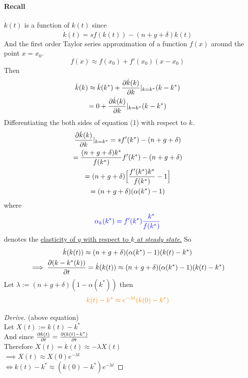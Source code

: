 \documentclass[]{article}
\begin{document}
	    \paragraph{Recall} $\dot{k}(t)$ is a function of $k(t)$ since 
	    \begin{equation}
	        \dot{k}(t) = sf(k(t)) - (n+g+\delta)k(t)
	    \end{equation}
	    And the first order Taylor series approximation of a function $f(x)$ around the point $x = x_0$.
	    \[
	        f(x) \approx f(x_0) + f'(x_0)(x - x_0)
	    \]
	    Then
	    \begin{gather*}
	        \dot{k}(k) \approx \dot{k}(k^*) + \frac{\partial{\dot{k}(k)}}{\partial{k}}|_{k=k^*} (k - k^*) \\
	        = 0 + \frac{\partial{\dot{k}(k)}}{\partial{k}}|_{k=k^*} (k - k^*)
	    \end{gather*}
	    Differentiating the both sides of equation (1) with respect to $k$.
	    \begin{gather*}
	        \frac{\partial{\dot{k}(k)}}{\partial{k}}|_{k=k^*} = sf'(k^*) - (n + g + \delta) \\
	        = \frac{(n + g + \delta) k^*}{f(k^*)} f'(k^*) - (n + g + \delta) \\
	        = (n + g + \delta) \Big [
	            \frac{f'(k^*) k^*}{f(k^*)} - 1
	            \Big ] \\
	        = (n + g + \delta) (\alpha (k^*) - 1)
	    \end{gather*}
	    where 
	    \begin{equation}
	    \textcolor{blue}{
	        \alpha_k (k^*) = f'(k^*)\frac{k^*}{f(k^*)}
	        }
	    \end{equation}
	    denotes the \ul{elasticity of $y$ with respect to $k$ \emph{at steady state}.}
	    So
	    \begin{gather*}
	        \dot{k}(k(t)) \approx (n + g + \delta) (\alpha (k^*) - 1) (k(t) - k^*) \\
	        \implies \frac{\partial{({k - k^*}(k))}}{\partial{t}} = \dot{k}(k(t)) \approx (n + g + \delta) (\alpha (k^*) - 1) (k(t) - k^*)
	    \end{gather*}
	    Let $\lambda := (n + g + \delta) (1 - \alpha (k^*))$ then 
	    \begin{gather}
	    \textcolor{orange}{
	        k(t) - k^* \approx e^{-\lambda t}(k(0) - k^*)
	    }
	    \end{gather}
	    \begin{remark}
		    \begin{proof}[Derive] (above equation)\\
		        Let $X(t) := k(t) - k^*$ \\
		        And since $\frac{\partial{k(t)}}{\partial{t}} = \frac{\partial{(k(t) - k^*)}}{\partial{t}}$ \\
		        Therefore $\dot{X}(t) = \dot{k}(t) \approx -\lambda X(t)$ \\
		        $\implies X(t) \approx X(0) e^{-\lambda t}$ \\
		        $\iff k(t) - k^* \approx (k(0) - k^*) e^{-\lambda t}$
		    \end{proof}
	    \end{remark}
\end{document}

